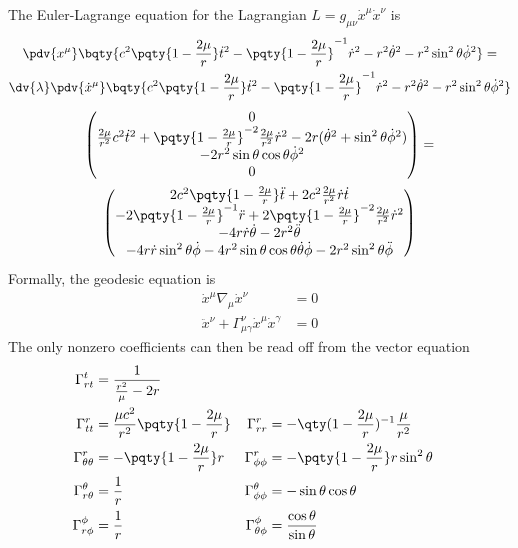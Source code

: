 \documentclass[12pt]{article}
\begin{document}
        \subsubsection{} The Euler-Lagrange equation for the Lagrangian \(L = g_{\mu\nu} \dot{x}^\mu \dot{x}^\nu\) is
        \begin{multline*}
            \pdv{x^\mu} \bqty{c^2 \pqty{1- \frac{2\mu}{r} } \dot{t}^2 - \pqty{1- \frac{2\mu}{r} }^{-1} \dot{r}^2 - r^2 \dot{\theta}^2 - r^2\sin^2\theta \dot{\phi}^2} =\\ \dv{\lambda} \pdv{\dot{x}^\mu} \bqty{c^2 \pqty{1- \frac{2\mu}{r} } \dot{t}^2 - \pqty{1- \frac{2\mu}{r} }^{-1} \dot{r}^2 - r^2 \dot{\theta}^2 - r^2\sin^2\theta \dot{\phi}^2}
        \end{multline*}
        \begin{multline*}
            \begin{pmatrix}  0\\\frac{2\mu}{r^2} c^2 \dot{t}^2 + \pqty{1 - \frac{2\mu}{r}}^{-2} \frac{2\mu}{r^2} \dot{r}^2 - 2r (\dot{\theta}^2 + \sin^2 \theta \dot{\phi}^2)\\- 2r^2 \sin\theta \cos\theta \dot{\phi}^2\\0  \end{pmatrix} =\\ \begin{pmatrix} 2c^2 \pqty{1- \frac{2\mu}{r} }\ddot{t} + 2c^2 \frac{2\mu}{r^2} \dot{r} \dot{t}\\ - 2 \pqty{1- \frac{2\mu}{r} }^{-1} \ddot{r} + 2 \pqty{1- \frac{2\mu}{r} }^{ - 2} \frac{2\mu}{r^2} \dot{r}^2 \\ - 4r \dot{r} \dot{\theta} - 2r^2 \ddot{\theta}\\ - 4r \dot{r} \sin^2\theta \dot{\phi} - 4r^2 \sin\theta \cos\theta \dot{\theta} \dot{\phi} - 2r^2 \sin^2\theta \ddot{\phi} \end{pmatrix} 
        \end{multline*}
        Formally, the geodesic equation is \begin{align*}
        \dot{x}^\mu \nabla_\mu \dot{x}^\nu &= 0\\
        \ddot{x}^\nu +\Gamma^{\nu}_{\mu \gamma} \dot{x}^\mu \dot{x}^\gamma&= 0
        \end{align*}
        The only nonzero coefficients can then be read off from the vector equation \begin{align*}
            \Gamma^{t}_{rt}&= \frac{1 }{\frac{r^2}{\mu} - 2r}\\
            \Gamma^{r}_{tt} &=  \frac{\mu c^2}{r^2}\pqty{1 - \frac{2\mu}{r}}&\Gamma^{r}_{rr} &= -\qty(1 - \frac{2\mu}{r})^{-1} \frac{\mu}{r^2} \\
            \Gamma^{r}_{\theta\theta} &=  -\pqty{1 - \frac{2\mu}{r}} r&\Gamma^{r}_{\phi \phi} &= - \pqty{1 - \frac{2\mu}{r}} r \sin^2\theta\\
            \Gamma^{\theta}_{r\theta} &= \frac{1}{r} &\Gamma^{\theta}_{\phi\phi} &= - \sin\theta \cos\theta\\
            \Gamma^{\phi}_{r\phi} &=  \frac{1}{r}& \Gamma^{\phi}_{\theta\phi} &=  \frac{\cos\theta}{\sin\theta} 
        \end{align*}
\end{document}
